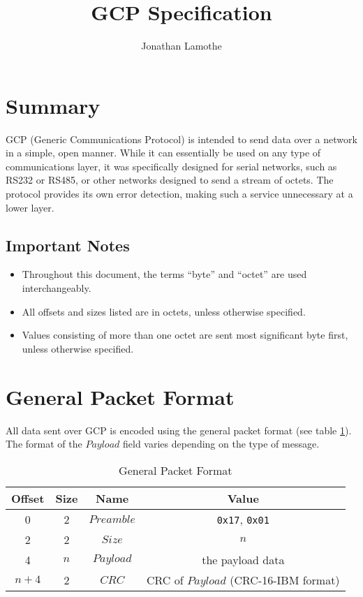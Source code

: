 \documentclass{article}
\title{GCP Specification}
\author{Jonathan Lamothe}
\begin{document}
\maketitle

\section{Summary}
GCP (Generic Communications Protocol) is intended to send data over a
network in a simple, open manner.  While it can essentially be used on
any type of communications layer, it was specifically designed for
serial networks, such as RS232 or RS485, or other networks designed to
send a stream of octets.  The protocol provides its own error
detection, making such a service unnecessary at a lower layer.

\subsection{Important Notes}
\begin{itemize}
\item Throughout this document, the terms ``byte'' and ``octet'' are
  used interchangeably.
\item All offsets and sizes listed are in octets, unless otherwise
  specified.
\item Values consisting of more than one octet are sent most
  significant byte first, unless otherwise specified.
\end{itemize}

\section{General Packet Format}
All data sent over GCP is encoded using the general packet format (see
table \ref{tab:gen-pkt-fmt}).  The format of the $Payload$ field
varies depending on the type of message.

\begin{table}[hbp]
  \center
  \begin{tabular}{cccc}
    \textbf{Offset} & \textbf{Size} & \textbf{Name} & \textbf{Value}\\
    \hline
    0 & 2 & $Preamble$ & \texttt{0x17}, \texttt{0x01}\\
    2 & 2 & $Size$ & $n$\\
    4 & $n$ & $Payload$ & the payload data\\
    $n + 4$ & 2 & $CRC$ & CRC of $Payload$ (CRC-16-IBM format)\\
    \hline
  \end{tabular}
  \caption{General Packet Format\label{tab:gen-pkt-fmt}}
\end{table}
\end{document}
